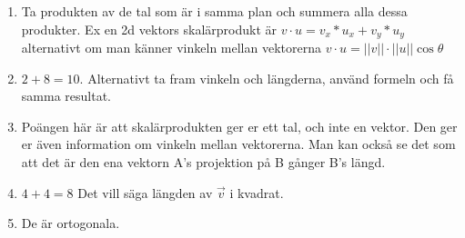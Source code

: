 \begin{enumerate}
\item Ta produkten av de tal som är i samma plan och summera alla dessa produkter. Ex en 2d vektors skalärprodukt är $v \cdot u = v_{x}*u_{x}+v_{y}*u_{y} $ alternativt om man känner vinkeln mellan vektorerna $v \cdot u = ||v||\cdot||u||\cos\theta$
\item $2+8=10$. Alternativt ta fram vinkeln och längderna, använd formeln och få samma resultat. 
\item Poängen här är att skalärprodukten ger er ett tal, och inte en vektor. Den ger er även information om vinkeln mellan vektorerna. Man kan också se det som att det är den ena vektorn A's projektion på B gånger B's längd. 
\item $4+4=8$ Det vill säga längden av $\vec{v}$ i kvadrat.
\item De är ortogonala.
\end{enumerate}